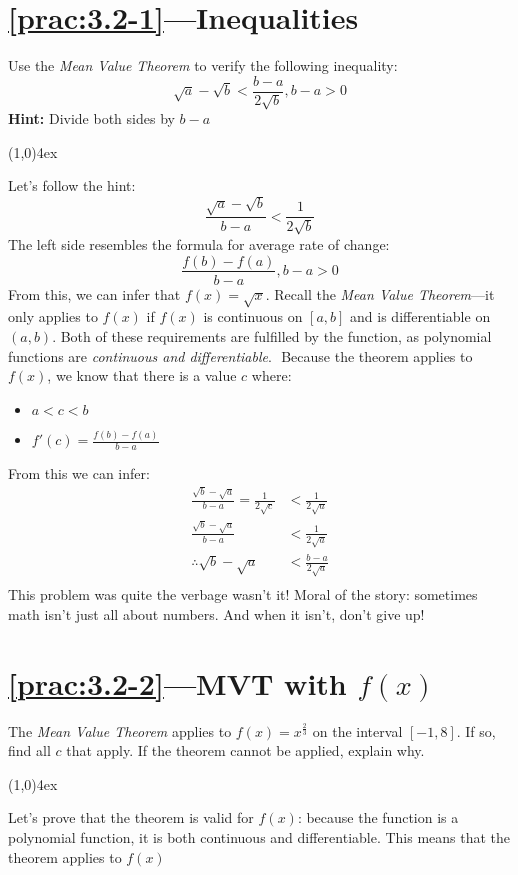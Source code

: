 \documentclass{MathNotes}
\newcommand{\br}{
\begin{center}
\line(1,0){4ex}
\end{center}}
\begin{document}
\section*{\ref{prac:3.2-1}---Inequalities}\label{ans:3.2-1}
Use the \textit{Mean Value Theorem} to verify the following inequality:
$$\sqrt{a}-\sqrt{b}<\frac{b-a}{2\sqrt{b}},b-a>0$$
\textbf{Hint:} Divide both sides by $b-a$
\br
Let's follow the hint:$$\frac{\sqrt{a}-\sqrt{b}}{b-a}<\frac{1}{2\sqrt{b}}$$
The left side resembles the formula for average rate of change:
$$\frac{f(b)-f(a)}{b-a},b-a>0$$
From this, we can infer that $f(x)=\sqrt{x}$. Recall the \textit{Mean Value 
Theorem}---it only applies to $f(x)$ if $f(x)$ is continuous on $[a, b]$ and
is differentiable on $(a, b)$. Both of these requirements are fulfilled by the
function, as polynomial functions are \textit{continuous and differentiable}.
\newline$ $\newline
Because the theorem applies to $f(x)$, we know that there is a value $c$ where:
\begin{multicols}{2}
\begin{itemize}
    \item $a<c<b$
    \item $f'(c)=\frac{f(b)-f(a)}{b-a}$
\end{itemize}
\end{multicols}

From this we can infer: 
\begin{align*}
    \frac{\sqrt{b}-\sqrt{a}}{b-a}=\frac{1}{2\sqrt{c}}&<\frac{1}{2\sqrt{a}}\\
    \frac{\sqrt{b}-\sqrt{a}}{b-a}&<\frac{1}{2\sqrt{a}}\\
    \therefore\sqrt{b}-\sqrt{a}&<\frac{b-a}{2\sqrt{a}}\\
\end{align*}
This problem was quite the verbage wasn't it! Moral of the story: sometimes
math isn't just all about numbers. And when it isn't, don't give up!

\section*{\ref{prac:3.2-2}---MVT with $f(x)$}\label{ans:3.2-2}
The \textit{Mean Value Theorem} applies to $f(x)=x^{\frac{2}{3}}$ on the 
interval $[-1, 8]$. If so, find all $c$ that apply. If the theorem cannot
be applied, explain why.
\br
{}
Let's prove that the theorem is valid for $f(x)$: because the function is
a polynomial function, it is both continuous and differentiable. This means
that the theorem applies to $f(x)$
\end{document}
